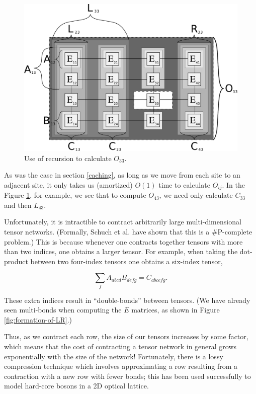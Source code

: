 \documentclass[12pt]{amsbook}
\theoremstyle{plain}
\theoremstyle{definition}
\theoremstyle{remark}
\begin{document}
\begin{figure}
\centering
\includegraphics[width=\columnwidth]{images/mypaper-diagram-38}
\caption{Use of recursion to calculate $O_{33}$. \label{fig:2d-recursive-structure}}
\end{figure}

As was the case in section \ref{caching}, as long as we move from each site to an adjacent site, it only takes us (amortized) $O(1)$ time to calculate $O_{ij}$.  In the Figure \ref{fig:2d-recursive-structure}, for example, we see that to compute $O_{43}$, we need only calculate $C_{33}$ and then $L_{43}$.

Unfortunately, it is intractible to contract arbitrarily large multi-dimensional tensor networks.  (Formally, Schuch et al. \cite{quant-ph/0611050} have shown that this is a \#P-complete problem.)  This is because whenever one contracts together tensors with more than two indices, one obtains a larger tensor.  For example, when taking the dot-product between two four-index tensors one obtains a six-index tensor,

$$\sum_f A_{abcd} B_{defg} = C_{abcefg}.$$

\noindent These extra indices result in ``double-bonds'' between tensors.  (We have already seen multi-bonds when computing the $E$ matrices, as shown in Figure \ref{fig:formation-of-LR}.)

Thus, as we contract each row, the size of our tensors increases by some factor, which means that the cost of contracting a tensor network in general grows exponentially with the size of the network!  Fortunately, there is a lossy compression technique which involves approximating a row resulting from a contraction with a new row with fewer bonds;  this has been used successfully to model hard-core bosons in a 2D optical lattice\cite{cond-mat/0611522}.
\end{document}

